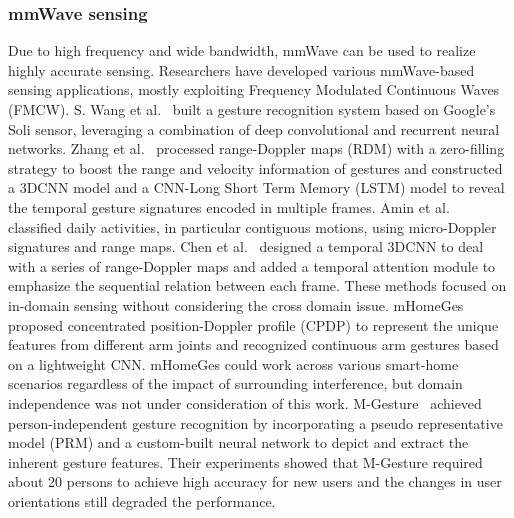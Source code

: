\subsubsection{mmWave sensing}
Due to high frequency and wide bandwidth, mmWave can be used to realize highly accurate sensing. Researchers have developed various mmWave-based sensing applications, mostly exploiting Frequency Modulated Continuous Waves (FMCW). 
S. Wang et al.~\cite{Soli:2016} built a gesture recognition system based on Google’s Soli sensor, leveraging a combination of deep convolutional and recurrent neural networks.
Zhang et al.~\cite{ZhangG:2020} processed range-Doppler maps (RDM) with a zero-filling strategy to boost the range and velocity information of gestures and constructed a 3DCNN model and a CNN-Long Short Term Memory (LSTM) model to reveal the temporal gesture signatures encoded in multiple frames. 
Amin et al.~\cite{Amin2020} classified daily activities, in particular contiguous motions, using micro-Doppler signatures and range maps. 
Chen et al.~\cite{ChenH:2022} designed a temporal 3DCNN to deal with a series of range-Doppler maps and added a temporal attention module to emphasize the sequential relation between each frame. 
These methods focused on in-domain sensing without considering the cross domain issue.
mHomeGes~\cite{LiuH:2020} proposed concentrated position-Doppler profile (CPDP) to represent the unique features from different arm joints and recognized continuous arm gestures based on a lightweight CNN. mHomeGes could work across various smart-home scenarios regardless of the impact of surrounding interference, but domain independence was not under consideration of this work.  
M-Gesture~\cite{LiuH:2022} achieved person-independent gesture recognition by incorporating a pseudo representative model (PRM) and a custom-built neural network to depict and extract the inherent gesture features. Their experiments showed that M-Gesture required about 20 persons to achieve high accuracy for new users and the changes in user orientations still degraded the performance. 
 
